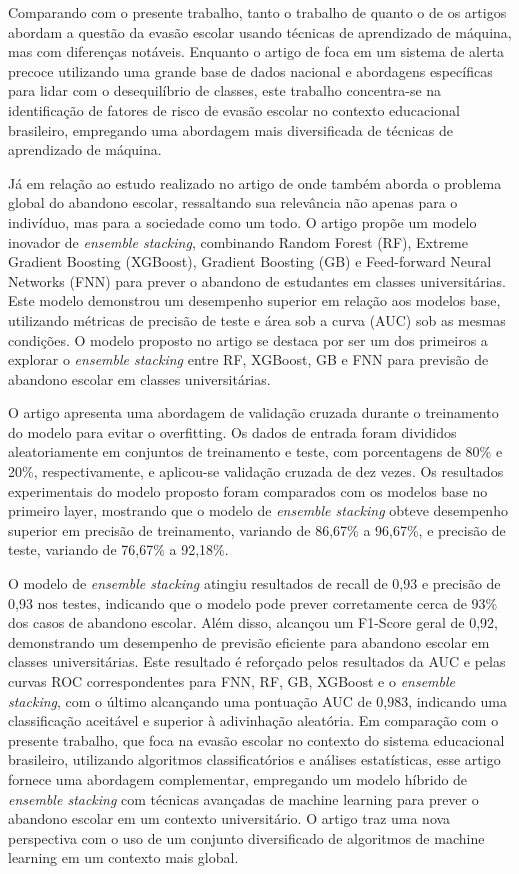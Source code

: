Comparando com o presente trabalho, tanto o trabalho de  quanto o de  os artigos abordam a questão da evasão escolar usando técnicas de aprendizado de máquina, mas com diferenças notáveis. Enquanto o artigo de  foca em um sistema de alerta precoce utilizando uma grande base de dados nacional e abordagens específicas para lidar com o desequilíbrio de classes, este trabalho concentra-se na identificação de fatores de risco de evasão escolar no contexto educacional brasileiro, empregando uma abordagem mais diversificada de técnicas de aprendizado de máquina.

Já em relação ao estudo realizado no artigo de  onde também aborda o problema global do abandono escolar, ressaltando sua relevância não apenas para o indivíduo, mas para a sociedade como um todo. O artigo propõe um modelo inovador de \textit{ensemble stacking}, combinando Random Forest (RF), Extreme Gradient Boosting (XGBoost), Gradient Boosting (GB) e Feed-forward Neural Networks (FNN) para prever o abandono de estudantes em classes universitárias. Este modelo demonstrou um desempenho superior em relação aos modelos base, utilizando métricas de precisão de teste e área sob a curva (AUC) sob as mesmas condições. O modelo proposto no artigo se destaca por ser um dos primeiros a explorar o \textit{ensemble stacking} entre RF, XGBoost, GB e FNN para previsão de abandono escolar em classes universitárias.

O artigo apresenta uma abordagem de validação cruzada durante o treinamento do modelo para evitar o overfitting. Os dados de entrada foram divididos aleatoriamente em conjuntos de treinamento e teste, com porcentagens de 80\% e 20\%, respectivamente, e aplicou-se validação cruzada de dez vezes. Os resultados experimentais do modelo proposto foram comparados com os modelos base no primeiro layer, mostrando que o modelo de \textit{ensemble stacking} obteve desempenho superior em precisão de treinamento, variando de 86,67\% a 96,67\%, e precisão de teste, variando de 76,67\% a 92,18\%.

O modelo de \textit{ensemble stacking} atingiu resultados de recall de 0,93 e precisão de 0,93 nos testes, indicando que o modelo pode prever corretamente cerca de 93\% dos casos de abandono escolar. Além disso, alcançou um F1-Score geral de 0,92, demonstrando um desempenho de previsão eficiente para abandono escolar em classes universitárias. Este resultado é reforçado pelos resultados da AUC e pelas curvas ROC correspondentes para FNN, RF, GB, XGBoost e o \textit{ensemble stacking}, com o último alcançando uma pontuação AUC de 0,983, indicando uma classificação aceitável e superior à adivinhação aleatória. Em comparação com o presente trabalho, que foca na evasão escolar no contexto do sistema educacional brasileiro, utilizando algoritmos classificatórios e análises estatísticas, esse artigo fornece uma abordagem complementar, empregando um modelo híbrido de \textit{ensemble stacking} com técnicas avançadas de machine learning para prever o abandono escolar em um contexto universitário. O artigo traz uma nova perspectiva com o uso de um conjunto diversificado de algoritmos de machine learning em um contexto mais global.


